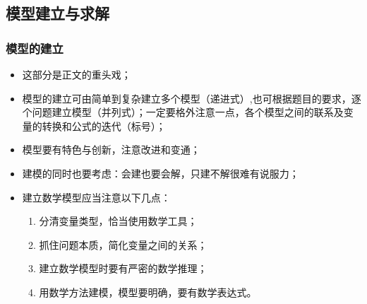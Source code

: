 \documentclass[openany]{progbookcn}
\begin{document}
\subsection{模型建立与求解}
\subsubsection{模型的建立}
\begin{itemize}
    \item 这部分是正文的重头戏；
    \item 模型的建立可由简单到复杂建立多个模型（递进式）,也可根据题目的要求，逐个问题建立模型（并列式）；一定要格外注意一点，各个模型之间的联系及变量的转换和公式的迭代（标号）；
    \item 模型要有特色与创新，注意改进和变通；
    \item 建模的同时也要考虑：会建也要会解，只建不解很难有说服力；
    \item 建立数学模型应当注意以下几点：
    \begin{enumerate}[itemindent=1em]
        \item 分清变量类型，恰当使用数学工具；
        \item 抓住问题本质，简化变量之间的关系；
        \item 建立数学模型时要有严密的数学推理；
        \item 用数学方法建模，模型要明确，要有数学表达式。
    \end{enumerate}
\end{itemize}
\end{document}
